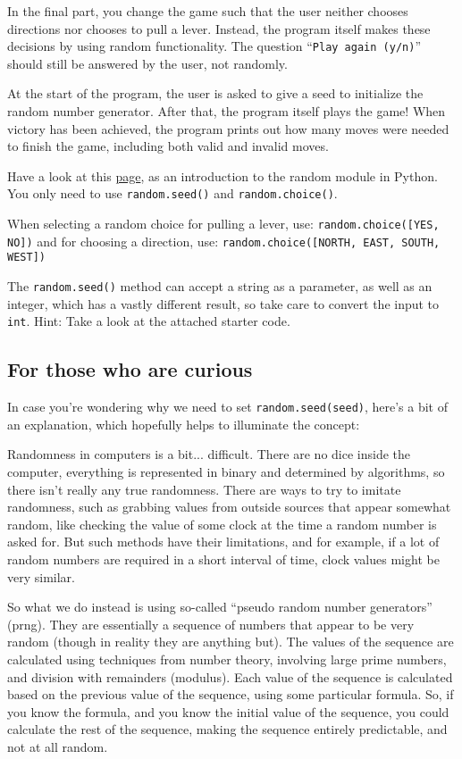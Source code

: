 
In the final part, you change the game such that the user neither chooses directions nor chooses to pull a lever.
Instead, the program itself makes these decisions by using random functionality.
The question ``\texttt{Play again (y/n)}'' should still be answered by the user, not randomly.

At the start of the program, the user is asked to give a seed to initialize the random number generator.
After that, the program itself plays the game!
When victory has been achieved,
the program prints out how many moves were needed to finish the game,
including both valid and invalid moves.

Have a look at this
\href{https://docs.python.org/3/library/random.html}{page},
as an introduction to the random module in Python.
You only need to use \texttt{random.seed()} and \texttt{random.choice()}.

When selecting a random choice for pulling a lever, use:
\texttt{random.choice([YES, NO])}
and for choosing a direction, use:
\texttt{random.choice([NORTH, EAST, SOUTH, WEST])}

The \texttt{random.seed()} method can accept a string as a parameter, as well as an integer,
which has a vastly different result, so take care to convert the input to \texttt{int}.
Hint: Take a look at the attached starter code.

\subsection*{For those who are curious}

In case you're wondering why we need to set \texttt{random.seed(seed)},
here's a bit of an explanation, which hopefully helps to illuminate the concept:

Randomness in computers is a bit... difficult.
There are no dice inside the computer,
everything is represented in binary and determined by algorithms,
so there isn't really any true randomness.
There are ways to try to imitate randomness,
such as grabbing values from outside sources that appear somewhat random,
like checking the value of some clock at the time a random number is asked for.
But such methods have their limitations, and for example,
if a lot of random numbers are required in a short interval of time, clock values might be very similar.

So what we do instead is using so-called ``pseudo random number generators'' (prng).
They are essentially a sequence of numbers that appear to be very random (though in reality they are anything but).
The values of the sequence are calculated using techniques from number theory,
involving large prime numbers, and division with remainders (modulus).
Each value of the sequence is calculated based on the previous value of the sequence, using some particular formula.
So, if you know the formula, and you know the initial value of the sequence, you could calculate the rest of the sequence,
making the sequence entirely predictable, and not at all random.

